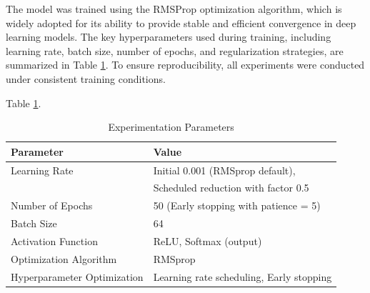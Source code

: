 \documentclass[iicol,sn-mathphys-num]{sn-jnl}%
\theoremstyle{thmstyleone}%
\theoremstyle{thmstyletwo}%
\theoremstyle{thmstylethree}%
\begin{document}
The model was trained using the RMSProp optimization algorithm, which is widely adopted for its ability to provide stable and efficient convergence in deep learning models. The key hyperparameters used during training, including learning rate, batch size, number of epochs, and regularization strategies, are summarized in Table \ref{tab:model_config}. To ensure reproducibility, all experiments were conducted under consistent training conditions. 

Table \ref{tab:model_config}.

\begin{table}[h]
\caption{Experimentation Parameters}\label{tab:model_config}
\centering
\normalsize
\begin{tabular}{@{}l | p{}@{}}
\toprule
\textbf{Parameter} & \textbf{Value} \\
\midrule
Learning Rate & Initial 0.001 (RMSprop default),\\ 
& Scheduled reduction with factor 0.5 \\ 
\midrule
Number of Epochs & 50 (Early stopping with patience = 5) \\
\midrule
Batch Size & 64 \\
\midrule
Activation Function & ReLU, Softmax (output) \\
\midrule
Optimization Algorithm & RMSprop \\
\midrule
Hyperparameter Optimization & Learning rate scheduling, Early stopping \\
\bottomrule
\end{tabular}
\end{table}
\end{document}
